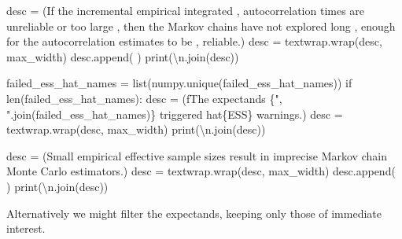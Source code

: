 \documentclass[
  letterpaper,
  DIV=11,
  numbers=noendperiod]{scrartcl}
\newenvironment{Shaded}{\begin{snugshade}}{\end{snugshade}}
\newcommand{\BuiltInTok}[1]{\textcolor[rgb]{0.00,0.23,0.31}{#1}}
\newcommand{\CharTok}[1]{\textcolor[rgb]{0.13,0.47,0.30}{#1}}
\newcommand{\ControlFlowTok}[1]{\textcolor[rgb]{0.00,0.23,0.31}{#1}}
\newcommand{\NormalTok}[1]{\textcolor[rgb]{0.00,0.23,0.31}{#1}}
\newcommand{\OperatorTok}[1]{\textcolor[rgb]{0.37,0.37,0.37}{#1}}
\newcommand{\SpecialCharTok}[1]{\textcolor[rgb]{0.37,0.37,0.37}{#1}}
\newcommand{\SpecialStringTok}[1]{\textcolor[rgb]{0.13,0.47,0.30}{#1}}
\newcommand{\StringTok}[1]{\textcolor[rgb]{0.13,0.47,0.30}{#1}}
\begin{document}
\begin{Shaded}
\begin{Highlighting}[]
\NormalTok{    desc }\OperatorTok{=}\NormalTok{ (}\StringTok{\textquotesingle{}If the incremental empirical integrated \textquotesingle{}}\NormalTok{,}
            \StringTok{\textquotesingle{}autocorrelation times are unreliable or too large \textquotesingle{}}\NormalTok{,}
            \StringTok{\textquotesingle{}then the Markov chains have not explored long \textquotesingle{}}\NormalTok{,}
            \StringTok{\textquotesingle{}enough for the autocorrelation estimates to be \textquotesingle{}}\NormalTok{,}
            \StringTok{\textquotesingle{}reliable.\textquotesingle{}}\NormalTok{)}
\NormalTok{    desc }\OperatorTok{=}\NormalTok{ textwrap.wrap(desc, max\_width)}
\NormalTok{    desc.append(}\StringTok{\textquotesingle{} \textquotesingle{}}\NormalTok{)}
    \BuiltInTok{print}\NormalTok{(}\StringTok{\textquotesingle{}}\CharTok{\textbackslash{}n}\StringTok{\textquotesingle{}}\NormalTok{.join(desc))}

\NormalTok{  failed\_ess\_hat\_names }\OperatorTok{=} \BuiltInTok{list}\NormalTok{(numpy.unique(failed\_ess\_hat\_names))}
  \ControlFlowTok{if} \BuiltInTok{len}\NormalTok{(failed\_ess\_hat\_names):}
\NormalTok{    desc }\OperatorTok{=}\NormalTok{ (}\SpecialStringTok{f\textquotesingle{}The expectands }\SpecialCharTok{\{}\StringTok{", "}\SpecialCharTok{.}\NormalTok{join(failed\_ess\_hat\_names)}\SpecialCharTok{\}}\SpecialStringTok{ \textquotesingle{}}
             \StringTok{\textquotesingle{}triggered hat}\SpecialCharTok{\{ESS\}}\StringTok{ warnings.\textquotesingle{}}\NormalTok{)}
\NormalTok{    desc }\OperatorTok{=}\NormalTok{ textwrap.wrap(desc, max\_width)}
    \BuiltInTok{print}\NormalTok{(}\StringTok{\textquotesingle{}}\CharTok{\textbackslash{}n}\StringTok{\textquotesingle{}}\NormalTok{.join(desc))}
    
\NormalTok{    desc }\OperatorTok{=}\NormalTok{ (}\StringTok{\textquotesingle{}Small empirical effective sample sizes result in \textquotesingle{}}
            \StringTok{\textquotesingle{}imprecise Markov chain Monte Carlo estimators.\textquotesingle{}}\NormalTok{)}
\NormalTok{    desc }\OperatorTok{=}\NormalTok{ textwrap.wrap(desc, max\_width)}
\NormalTok{    desc.append(}\StringTok{\textquotesingle{} \textquotesingle{}}\NormalTok{)}
    \BuiltInTok{print}\NormalTok{(}\StringTok{\textquotesingle{}}\CharTok{\textbackslash{}n}\StringTok{\textquotesingle{}}\NormalTok{.join(desc))}
\end{Highlighting}
\end{Shaded}

Alternatively we might filter the expectands, keeping only those of
immediate interest.
\end{document}
